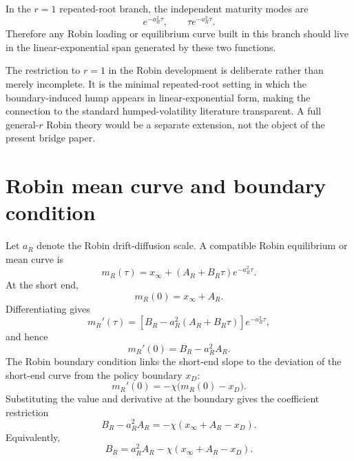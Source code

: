 \documentclass[11pt]{article}
\numberwithin{equation}{section}
\begin{document}
In the $r=1$ repeated-root branch, the independent maturity modes are
\begin{equation}
e^{-a_R^2\tau},
\qquad
\tau e^{-a_R^2\tau}.
\end{equation}
Therefore any Robin loading or equilibrium curve built in this branch should live in the linear-exponential span generated by these two functions.

The restriction to $r=1$ in the Robin development is deliberate rather than merely incomplete. It is the minimal repeated-root setting in which the boundary-induced hump appears in linear-exponential form, making the connection to the standard humped-volatility literature transparent. A full general-$r$ Robin theory would be a separate extension, not the object of the present bridge paper.

\section{Robin mean curve and boundary condition}

Let $a_R$ denote the Robin drift-diffusion scale. A compatible Robin equilibrium or mean curve is
\begin{equation}
\label{eq:robin-mean-curve}
m_R(\tau)=x_\infty+(A_R+B_R\tau)e^{-a_R^2\tau}.
\end{equation}
At the short end,
\begin{equation}
m_R(0)=x_\infty+A_R.
\end{equation}
Differentiating gives
\begin{equation}
m_R'(\tau)=\left[B_R-a_R^2(A_R+B_R\tau)\right]e^{-a_R^2\tau},
\end{equation}
and hence
\begin{equation}
m_R'(0)=B_R-a_R^2A_R.
\end{equation}
The Robin boundary condition links the short-end slope to the deviation of the short-end curve from the policy boundary $x_D$:
\begin{equation}
m_R'(0)=-\chi\bigl(m_R(0)-x_D\bigr).
\end{equation}
Substituting the value and derivative at the boundary gives the coefficient restriction
\begin{equation}
B_R-a_R^2A_R=-\chi(x_\infty+A_R-x_D).
\end{equation}
Equivalently,
\begin{equation}
\label{eq:robin-boundary-coefficient}
B_R=a_R^2A_R-\chi(x_\infty+A_R-x_D).
\end{equation}
\end{document}
